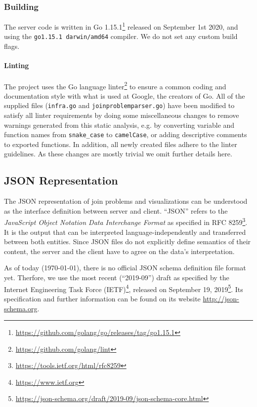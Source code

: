 \subsubsection{Building}

The server code is written in Go 1.15.1\footnote{\url{https://github.com/golang/go/releases/tag/go1.15.1}} released on September 1st 2020, and using the \texttt{go1.15.1 darwin/amd64} compiler. We do not set any custom build flags.

\paragraph{Linting} The project uses the Go language linter\footnote{\url{https://github.com/golang/lint}} to ensure a common coding and documentation style with what is used at Google, the creators of Go.
All of the supplied files (\texttt{infra.go} and \texttt{joinproblemparser.go}) have been modified to satisfy all linter requirements by doing some miscellaneous changes to remove warnings generated from this static analysis, e.g. by converting variable and function names from \texttt{snake\_case} to \texttt{camelCase}, or adding descriptive comments to exported functions. In addition, all newly created files adhere to the linter guidelines. As these changes are mostly trivial we omit further details here. 

\subsection{JSON Representation}
\label{sub:json-representation}

The JSON representation of join problems and visualizations can be understood as the interface definition between server and client. 
``JSON'' refers to the \textit{JavaScript Object Notation Data Interchange Format} as specified in RFC 8259\footnote{\url{https://tools.ietf.org/html/rfc8259}}.
It is the output that can be interpreted language-independently and transferred between both entities. Since JSON files do not explicitly define semantics of their content, the server and the client have to agree on the data's interpretation.

As of today (\today), there is no official JSON schema definition file format yet. Therfore, we use the most recent (``2019-09'') draft as specified by the Internet Engineering Task Force (IETF)\footnote{\url{https://www.ietf.org}}, released on September 19, 2019\footnote{\url{https://json-schema.org/draft/2019-09/json-schema-core.html}}. Its specification and further information can be found on its website \url{http://json-schema.org}.


